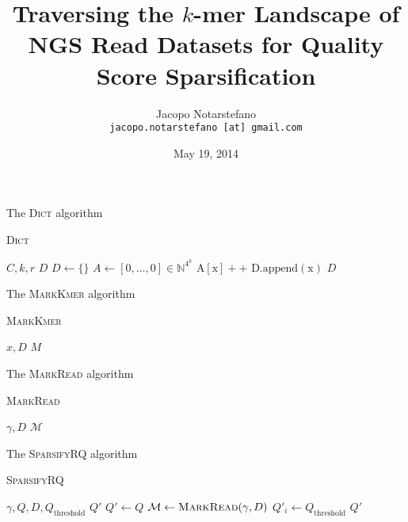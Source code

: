 \documentclass[12pt]{beamer}
\title{Traversing the \(k\)-mer Landscape of NGS Read Datasets for Quality Score Sparsification}
\author[Jacopo Notarstefano]{
    Jacopo Notarstefano\\
    \texttt{jacopo.notarstefano [at] gmail.com}
}
\date{May 19, 2014}
\begin{document}
    \begin{frame}[plain]
        \titlepage
    \end{frame}

    \begin{frame}{}
    \end{frame}

    \begin{frame}{The \textsc{Dict} algorithm}
        \begin{algorithm}[H]
	    \caption{\textsc{Dict}}
	    \begin{algorithmic}[]
                \REQUIRE \(C, k, r\)
		\ENSURE \(D\)
		\STATE \(D \leftarrow \{\}\)
		\STATE \(A \leftarrow [0,\dots,0] \in \mathbb{N}^{4^k}\)
		    \STATE \(\text{A}[\text{x}]++\)
		\ENDFOR
		        \STATE \(\text{D}.\text{append}(\text{x})\)
		    \ENDIF
		\ENDFOR
		\RETURN \(D\)
	    \end{algorithmic}
	\end{algorithm}
    \end{frame}

    \begin{frame}{The \textsc{MarkKmer} algorithm}
        \begin{algorithm}[H]
	    \caption{\textsc{MarkKmer}}
	    \begin{algorithmic}[]
	        \REQUIRE \(x, D\)
		\ENSURE \(M\)
	    \end{algorithmic}
	\end{algorithm}
    \end{frame}

    \begin{frame}{The \textsc{MarkRead} algorithm}
        \begin{algorithm}[H]
	    \caption{\textsc{MarkRead}}
	    \begin{algorithmic}[]
		\REQUIRE \(\gamma, D\)
		\ENSURE \(\mathcal{M}\)
	    \end{algorithmic}
	\end{algorithm}
    \end{frame}

    \begin{frame}{The \textsc{SparsifyRQ} algorithm}
        \begin{algorithm}[H]
	    \caption{\textsc{SparsifyRQ}}
	    \begin{algorithmic}[1]
		\REQUIRE \(\gamma,Q,D,Q_{\text{threshold}}\)
		\ENSURE \(Q'\)
                \STATE \(Q' \leftarrow Q\)
		\STATE \(\mathcal{M} \leftarrow \text{\textsc{MarkRead}}(\gamma, D)\)
		        \STATE \(Q'_i \leftarrow Q_{\text{threshold}}\)
		    \ENDIF
		\ENDFOR
		\RETURN \(Q'\)
	    \end{algorithmic}
	\end{algorithm}
    \end{frame}
\end{document}
